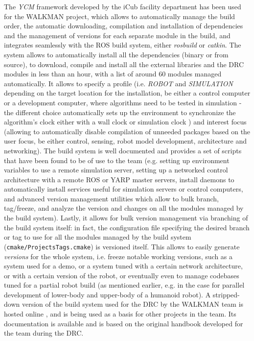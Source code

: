 The \emph{YCM} framework developed by the iCub facility department has been used for the WALKMAN project, which allows to automatically manage the build order, the automatic downloading, compilation and installation of dependencies and the management of versions for each separate module in the build, and integrates seamlessly with the ROS build system, either \emph{rosbuild} or \emph{catkin}.
The system allows to automatically install all the dependencies (binary or from source), to download, compile and install all the external libraries and the DRC modules in less than an hour, with a list of around $60$ modules managed automatically. It allows to specify a profile (i.e. \emph{ROBOT} and \emph{SIMULATION} depending on the target location for the installation, be either a control computer or a development computer, where algorithms need to be tested in simulation - the different choice automatically sets up the environment to synchronize the algorithm's clock either with a wall clock or simulation clock \label{sec:simulation_clock}) and interest focus (allowing to automatically disable compilation of unneeded packages based on the user focus, be either control, sensing, robot model development, architecture and networking). The build system is well documented and provides a set of scripts that have been found to be of use to the team (e.g. setting up environment variables to use a remote simulation server, setting up a networked control architecture with a remote ROS or YARP master servers, install daemons to automatically install services useful for simulation servers or control computers, and advanced version management utilities which allow to bulk branch, tag/freeze, and analyze the version and changes on all the modules managed by the build system). Lastly, it allows for bulk version management via branching of the build system itself: in fact, the configuration file specifying the desired branch or tag to use for all the modules managed by the build system (\texttt{cmake/ProjectsTags.cmake}) is versioned itself. This allows to easily generate \emph{versions} for the whole system, i.e. freeze notable working versions,  such as a system used for a demo, or a system tuned with a certain network architecture, or with a certain version of the robot, or eventually even to manage codebases tuned for a partial robot build (as mentioned earlier, e.g. in the case for parallel development of lower-body and upper-body of a humanoid robot).
A stripped-down version of the build system used for the DRC by the WALKMAN team is hosted online \cite{robotology-superbuild}, and is being used as a basis for other projects in the team. Its documentation is available \cite{robotology-superbuild-handbook} and is based on the original handbook developed for the team during the DRC.

